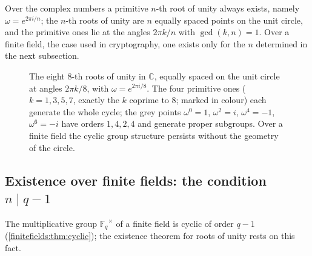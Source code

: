\documentclass[11pt,a4paper]{article}
\theoremstyle{definition}
\theoremstyle{remark}
\providecommand{\C}{}\renewcommand{\C}{\ensuremath{\mathbb{C}}}
\newcommand{\Fq}{\ensuremath{\mathbb{F}_{q}}}
\begin{document}
Over the complex numbers a primitive \(n\)-th root of unity always
exists, namely \(\omega = e^{2\pi i/n}\); the \(n\)-th roots of unity
are \(n\) equally spaced points on the unit circle, and the primitive
ones lie at the angles \(2\pi k/n\) with \(\gcd(k, n) = 1\). Over a
finite field, the case used in cryptography, one exists only for the
\(n\) determined in the next subsection.

\begin{figure}[htbp]
\centering
{}
\caption{The eight \(8\)-th roots of unity in \(\C\), equally spaced on
the unit circle at angles \(2\pi k/8\), with
\(\omega = e^{2\pi i/8}\). The four primitive ones (\(k = 1, 3, 5, 7\),
exactly the \(k\) coprime to \(8\); marked in colour) each generate the
whole cycle; the grey points \(\omega^0 = 1\), \(\omega^2 = i\),
\(\omega^4 = -1\), \(\omega^6 = -i\) have orders \(1, 4, 2, 4\) and
generate proper subgroups. Over a finite field the cyclic group
structure persists without the geometry of the circle.}
\label{rootsofunity:fig-circle}
\end{figure}

\subsection{Existence over finite fields: the condition
\texorpdfstring{\(n \mid q-1\)}{n divides q-1}}
\label{rootsofunity:sub-existence}

The multiplicative group \(\Fq^\times\) of a finite field is cyclic of
order \(q - 1\) (\cref{finitefields:thm:cyclic}); the existence theorem
for roots of unity rests on this fact.
\end{document}
